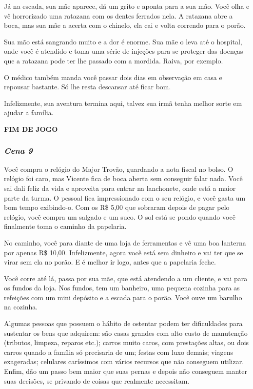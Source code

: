 Já na escada, sua mãe aparece, dá um grito e aponta para a sua mão. Você olha e vê horrorizado uma ratazana com os dentes ferrados nela. A ratazana abre a boca, mas sua mãe a acerta com o chinelo, ela cai e volta correndo para o porão.

Sua mão está sangrando muito e a dor é enorme. Sua mãe o leva até o hospital, onde você é atendido e toma uma série de injeções para se proteger das doenças que a ratazana pode ter lhe passado com a mordida. Raiva, por exemplo.

O médico também manda você passar dois dias em observação em casa e repousar bastante. Só lhe resta descansar até ficar bom.

Infelizmente, sua aventura termina aqui, talvez sua irmã tenha melhor sorte em ajudar a família.

\textbf{FIM DE JOGO}

\bigskip\medskip

\subsubsection{\textit{\textbf{Cena 9}}}

Você compra o relógio do Major Trovão, guardando a nota fiscal no bolso. O relógio foi caro, mas Vicente fica de boca aberta sem conseguir falar nada. Você sai dali feliz da vida e aproveita para entrar na lanchonete, onde está a maior parte da turma. O pessoal fica impressionado com o seu relógio, e você gasta um bom tempo exibindo-o. Com os R\$ 5,00 que sobraram depois de pagar pelo relógio, você compra um salgado e um suco. O sol está se pondo quando você finalmente toma o caminho da papelaria.

No caminho, você para diante de uma loja de ferramentas e vê uma boa lanterna por apenas R\$ 10,00. Infelizmente, agora você está sem dinheiro e vai ter que se virar sem ela no porão. E é melhor ir logo, antes que a papelaria feche.

Você corre até lá, passa por sua mãe, que está atendendo a um cliente, e vai para os fundos da loja. Nos fundos, tem um banheiro, uma pequena cozinha para as refeições com um mini depósito e a escada para o porão. Você ouve um barulho na cozinha.

Algumas pessoas que possuem o hábito de ostentar podem ter dificuldades para sustentar os bens que adquirem: são casas grandes com alto custo de manutenção (tributos, limpeza, reparos etc.); carros muito caros, com prestações altas, ou dois carros quando a família só precisaria de um; festas com luxo demais; viagens exageradas; celulares caríssimos com vários recursos que não conseguem utilizar. Enfim, dão um passo bem maior que suas pernas e depois não conseguem manter suas decisões, se privando de coisas que realmente necessitam.

